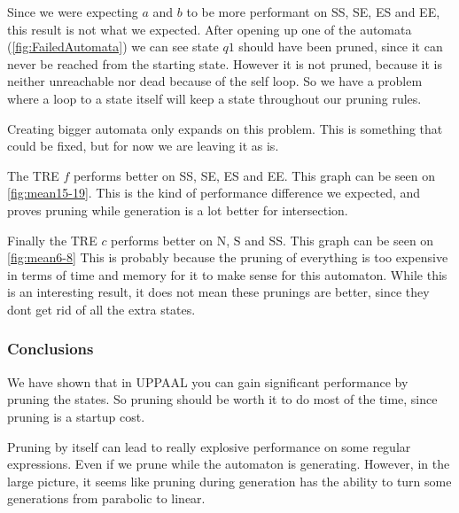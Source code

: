 \resizebox{\columnwidth}{!}{
    
}
\label{fig:mean3-5}

Since we were expecting $a$ and $b$ to be more performant on SS, SE, ES and EE, this result is not what we expected.
After opening up one of the automata (\cref{fig:FailedAutomata}) we can see state $q1$ should have been pruned, since it can never be reached from the starting state.
However it is not pruned, because it is neither unreachable nor dead because of the self loop.
So we have a problem where a loop to a state itself will keep a state throughout our pruning rules.



Creating bigger automata only expands on this problem. This is something that could be fixed, but for now we are leaving it as is.

The TRE $f$ performs better on SS, SE, ES and EE.
This graph can be seen on \cref{fig:mean15-19}.
This is the kind of performance difference we expected, and proves pruning while generation is a lot better for intersection.

\resizebox{\columnwidth}{!}{
    
}

\resizebox{\columnwidth}{!}{
    
}
\label{fig:mean15-19}

Finally the TRE $c$ performs better on N, S and SS.
This graph can be seen on \cref{fig:mean6-8}
This is probably because the pruning of everything is too expensive in terms of time and memory for it to make sense for this automaton.
While this is an interesting result, it does not mean these prunings are better, since they dont get rid of all the extra states.

\resizebox{\columnwidth}{!}{
    
}

\resizebox{\columnwidth}{!}{
    
}
\label{fig:mean6-8}

\subsubsection{Conclusions}
We have shown that in UPPAAL you can gain significant performance by pruning the states.
So pruning should be worth it to do most of the time, since pruning is a startup cost.

Pruning by itself can lead to really explosive performance on some regular expressions.
Even if we prune while the automaton is generating.
However, in the large picture, it seems like pruning during generation has the ability to turn some generations from parabolic to linear.